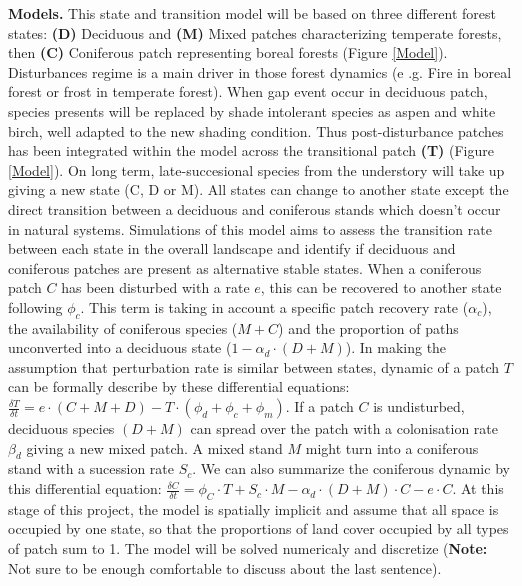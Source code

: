 \textbf{Models.} This state and transition model will be based on three
different forest states: \textbf{(D)} Deciduous and \textbf{(M)} Mixed patches
characterizing temperate forests, then \textbf{(C)} Coniferous patch
representing boreal forests (Figure \ref{Model}). Disturbances regime is a
main driver in those forest dynamics (e .g. Fire in boreal forest or frost in
temperate forest). When gap event occur in deciduous patch, species presents
will be replaced by shade intolerant species as aspen and white birch, well
adapted to the new shading condition. Thus post-disturbance patches has been
integrated within the model across the transitional patch \textbf{(T)} (Figure
\ref{Model}).  On long term, late-succesional species from the understory will
take up giving a new state (C, D or M). All states can change to another state
except the direct transition between a deciduous and coniferous stands which
doesn't occur in natural systems. Simulations of this model aims to assess the
transition rate between each state in the overall landscape and identify if
deciduous and coniferous patches are present as alternative stable states.
When a coniferous patch $C$ has been disturbed with a rate $e$, this can be
recovered to another state following $\phi_c$. This term is taking in account
a specific patch recovery rate ($\alpha_{c}$), the availability of coniferous
species ($M+C$) and the proportion of paths unconverted into a deciduous state
($1- \alpha_d \cdot (D +M)$). In making the assumption that perturbation rate
is similar between states, dynamic of a patch $T$ can be formally describe by
these differential equations: $\frac{\delta T}{\delta t} = e \cdot (C+M+D) - T
\cdot (\phi_d + \phi_c + \phi_m)$. If a patch $C$ is undisturbed, deciduous
species $(D+M)$ can spread over the patch with a colonisation rate $\beta_d$
giving a new mixed patch. A mixed stand $M$ might turn into a coniferous stand
with a sucession rate $S_c$.  We can also summarize the coniferous dynamic by
this differential equation: $\frac{\delta C}{\delta t} = \phi_C \cdot T + S_c
\cdot M - \alpha_d \cdot (D+M)\cdot C - e \cdot C$. At this stage of this
project, the model is spatially implicit and assume that all space is occupied
by one state, so that the proportions of land cover occupied by all types of
patch sum to 1. The model will be solved numericaly and discretize (\textbf{Note:} Not
sure to be enough comfortable to discuss about the last sentence).\\

